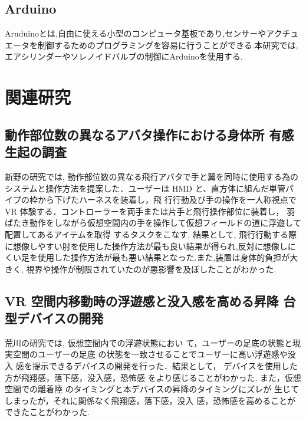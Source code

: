 \subsection{Arduino}

Aruduinoとは,自由に使える小型のコンピュータ基板であり,センサーやアクチュエータを制御するためのプログラミングを容易に行うことができる.本研究では,エアシリンダーやソレノイドバルブの制御にArduinoを使用する.

\section{関連研究}

\subsection{動作部位数の異なるアバタ操作における身体所
有感生起の調査}

新野の研究では, 動作部位数の異なる飛行アバタで手と翼を同時に使用する為のシステムと操作方法を提案した．ユーザーは HMD と、直方体に組んだ単管パイプの枠から下げたハーネスを装着し，飛
行行動及び手の操作を一人称視点で VR 体験する．コントローラーを両手または片手と飛行操作部位に装着し，
羽ばたき動作をしながら仮想空間内の手を操作して仮想フィールドの道に浮遊して配置してあるアイテムを取得
するタスクをこなす.
結果として, 飛行行動する際に想像しやすい肘を使用した操作方法が最も良い結果が得られ,反対に想像しにくい足を使用した操作方法が最も悪い結果となった.また,装置は身体的負担が大きく, 視界や操作が制限されていたのが悪影響を及ぼしたことがわかった.

\subsection{VR 空間内移動時の浮遊感と没入感を高める昇降
台型デバイスの開発}

荒川の研究では, 仮想空間内での浮遊状態におい
て，ユーザーの足底の状態と現実空間のユーザーの足底
の状態を一致させることでユーザーに高い浮遊感や没入
感を提示できるデバイスの開発を行った．結果として，
デバイスを使用した方が飛翔感，落下感，没入感，恐怖感
をより感じることがわかった. また，仮想空間での離着陸
のタイミングと本デバイスの昇降のタイミングにズレが
生じてしまったが，それに関係なく飛翔感，落下感，没入
感，恐怖感を高めることができたことがわかった.



